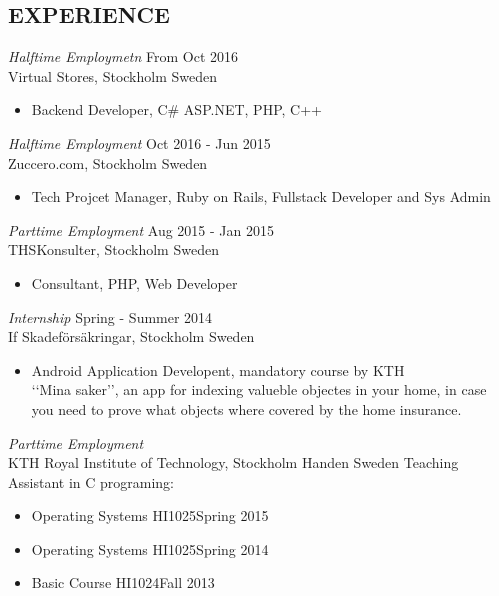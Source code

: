 \documentclass[margin]{res}
\begin{document}
\begin{resume}
\section{EXPERIENCE}
{\sl Halftime Employmetn } \hfill From Oct 2016 \\
                Virtual Stores, Stockholm Sweden
                \begin{itemize} \itemsep -2pt
                \item Backend Developer, C\# ASP.NET, PHP, C++ \hfill 
                \end{itemize}
{\sl Halftime Employment } \hfill  Oct 2016 - Jun 2015 \\
                Zuccero.com, Stockholm Sweden
                 \begin{itemize}  \itemsep -2pt %
                 \item  Tech Projcet Manager, Ruby on Rails, Fullstack Developer and Sys Admin\hfill 
                \end{itemize}
{\sl Parttime Employment } \hfill  Aug 2015 - Jan 2015 \\
                THSKonsulter, Stockholm Sweden
                 \begin{itemize}  \itemsep -2pt %
                 \item  Consultant, PHP, Web Developer\hfill 
                \end{itemize}
    {\sl Internship } \hfill Spring - Summer 2014 \\
                If Skadeförsäkringar, Stockholm Sweden
                 \begin{itemize}  \itemsep -2pt %
                 \item Android Application Developent, mandatory course by KTH \\ ‘‘Mina saker’’, an app for indexing valueble objectes in your home, in case you need to prove what objects where covered by the home insurance.
                \end{itemize}

   {\sl Parttime Employment }  \\
               KTH Royal Institute of Technology, Stockholm Handen Sweden
               Teaching Assistant in C programing:
                 \begin{itemize}  \itemsep -2pt %
                 \item   Operating Systems HI1025\hfill Spring 2015
                 \item  Operating Systems HI1025\hfill Spring 2014
                 \item  Basic Course HI1024\hfill Fall 2013
                \end{itemize}


\end{resume}
\end{document}
